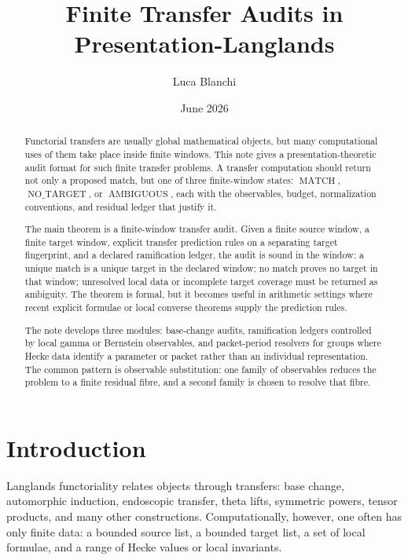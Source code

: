 \documentclass[11pt]{article}
\title{Finite Transfer Audits in Presentation-Langlands}
\author{Luca Blanchi}
\date{June 2026}
\DeclareMathOperator{\MATCH}{MATCH}
\DeclareMathOperator{\NOTARGET}{NO\_TARGET}
\DeclareMathOperator{\AMBIGUOUS}{AMBIGUOUS}
\begin{document}
\maketitle

\begin{abstract}
Functorial transfers are usually global mathematical objects, but many computational uses of them take place inside finite windows.  This note gives a presentation-theoretic audit format for such finite transfer problems.  A transfer computation should return not only a proposed match, but one of three finite-window states: \(\MATCH\), \(\NOTARGET\), or \(\AMBIGUOUS\), each with the observables, budget, normalization conventions, and residual ledger that justify it.

The main theorem is a finite-window transfer audit.  Given a finite source window, a finite target window, explicit transfer prediction rules on a separating target fingerprint, and a declared ramification ledger, the audit is sound in the window: a unique match is a unique target in the declared window; no match proves no target in that window; unresolved local data or incomplete target coverage must be returned as ambiguity.  The theorem is formal, but it becomes useful in arithmetic settings where recent explicit formulae or local converse theorems supply the prediction rules.

The note develops three modules: base-change audits, ramification ledgers controlled by local gamma or Bernstein observables, and packet-period resolvers for groups where Hecke data identify a parameter or packet rather than an individual representation.  The common pattern is observable substitution: one family of observables reduces the problem to a finite residual fibre, and a second family is chosen to resolve that fibre.
\end{abstract}

\section{Introduction}

Langlands functoriality relates objects through transfers: base change, automorphic induction, endoscopic transfer, theta lifts, symmetric powers, tensor products, and many other constructions.  Computationally, however, one often has only finite data: a bounded source list, a bounded target list, a set of local formulae, and a range of Hecke values or local invariants.
\end{document}
